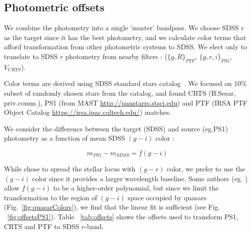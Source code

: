 \documentclass[twocolumn]{aastex62}
\begin{document}
\subsection{Photometric offsets}

We combine the photometry into a single 'master' bandpass. We choose SDSS r as the target since it has the best photometry, and we calculate color terms that afford transformation from other photometric systems to SDSS. We elect only to translate to SDSS $r$ photometry from nearby filters : ($\{g,R\}_{PTF}$, $\{g,r,i\}_{PS1}$, $V_{CRTS}$). 

Color terms are derived using SDSS standard stars catalog~\citep{ivezic2007}.  We focused on 10\% subset of randomly chosen stars from the catalog, and found CRTS (B.Sesar, priv.comm.), PS1 (from MAST \url{http://panstarrs.stsci.edu}) and PTF (IRSA PTF Object Catalog \url{https://irsa.ipac.caltech.edu/}) matches. 

We consider the difference  between the target (SDSS) and source (eg.PS1) photometry as a function of mean SDSS $(g-i)$ color : 


\begin{equation}
m_{PS1} - m_{SDSS} = f(g-i)
\end{equation}

While \cite{tonry2012} chose to spread the stellar locus with $(g-r)$ color, we prefer to use the $(g-i)$ color since it provides a larger wavelength baseline. Some authors (eg. \citet{li2018}) allow $f(g-i)$ to be a higher-order polynomial, but since we limit the transformation to the  region of $(g-i)$ space occupied by quasars (Fig.~\ref{fig:quasarColors}), we find that the linear fit is sufficient (see Fig. ~\ref{fig:offsetsPS1}).   Table ~\ref{tab:offsets} shows the offsets used to transform PS1, CRTS and PTF to SDSS $r$-band. 


\begin{figure*}
\caption{Regions occupied in color-color space by S82 quasars (colors) and standard stars (contours) 	\citep{schneider2010}. We show only 10 000  randomly chosen stars from the  full 1 mln + standard stars catalog \citealt{ivezic2007}. We limit the offset to  SDSS $-0.5<(g-i)<1.$. Quasars also overlap other variable sources (eg. RRLyrae), not shown on this illustration \citealt{sesar2007}. }
\label{fig:quasarColors}
\end{figure*} 


\begin{figure*}
\caption{The SDSS-PS1 offsets. We plot only bright stars where SDSS $r < 19$, and that fulfill  mErr * sqrt(Nobs) < 0.03 . Each panel includes about 6000 standard stars. Vertical dashed lines mark the region in the SDSS color space occupied by quasars (see Fig.~\ref{fig:quasarColors}), used to fit the stellar locus with a polynomial.}
\label{fig:offsetsPS1}
\end{figure*} 
\end{document}
